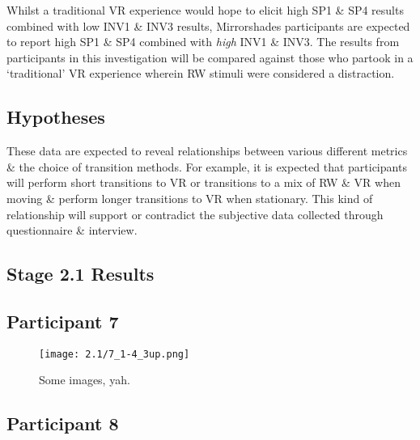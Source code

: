 Whilst a traditional VR experience would hope to elicit high SP1 \& SP4 results combined with low INV1 \& INV3 results, Mirrorshades participants are expected to report high SP1 \& SP4 combined with \textit{high} INV1 \& INV3. The results from participants in this investigation will be compared against those who partook in a `traditional' VR experience wherein RW stimuli were considered a distraction.





\subsection{Hypotheses}
These data are expected to reveal relationships between various different metrics \& the choice of transition methods. For example, it is expected that participants will perform short transitions to VR or transitions to a mix of RW \& VR when moving \& perform longer transitions to VR when stationary. This kind of relationship will support or contradict the subjective data collected through questionnaire \& interview.

\subsection{Stage 2.1 Results}


\clearpage

\subsection{Participant 7}

\begin{figure}[h]
	\begin{center}
	\texttt{[image: 2.1/7\_1-4\_3up.png]}
	\caption{Some images, yah.}
	\end{center}
\end{figure}


\clearpage

\subsection{Participant 8}

